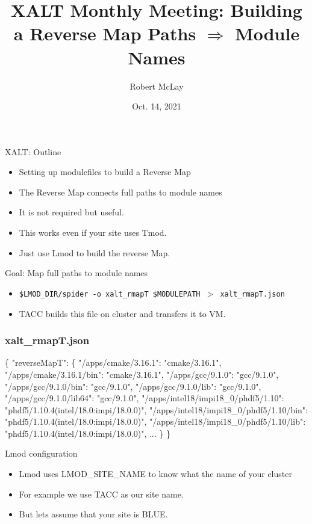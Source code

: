 \documentclass{beamer}
\begin{document}
\title[XALT]{XALT Monthly Meeting: Building a Reverse Map Paths $\Rightarrow$ Module Names}
\author{Robert McLay} 
\date{Oct. 14, 2021} 

\frame{\titlepage} 

\begin{frame}{XALT: Outline}
  \begin{itemize}
    \item Setting up modulefiles to build a Reverse Map
    \item The Reverse Map connects full paths to module names
    \item It is not required but useful.
    \item This works even if your site uses Tmod.
    \item Just use Lmod to build the reverse Map.
  \end{itemize}
\end{frame}

\begin{frame}{Goal: Map full paths to module names}
  \begin{itemize}
    \item \texttt{\$LMOD\_DIR/spider -o xalt\_rmapT \$MODULEPATH $>$ xalt\_rmapT.json}
    \item TACC builds this file on cluster and transfers it to VM.
  \end{itemize}
\end{frame}

\begin{frame}[fragile]
    \frametitle{xalt\_rmapT.json}
 {\tiny
    \begin{semiverbatim}
\{
 "reverseMapT": \{
     "/apps/cmake/3.16.1": "cmake/3.16.1",
     "/apps/cmake/3.16.1/bin": "cmake/3.16.1",
     "/apps/gcc/9.1.0": "gcc/9.1.0",
     "/apps/gcc/9.1.0/bin": "gcc/9.1.0",
     "/apps/gcc/9.1.0/lib": "gcc/9.1.0",
     "/apps/gcc/9.1.0/lib64": "gcc/9.1.0",
     "/apps/intel18/impi18_0/phdf5/1.10": "phdf5/1.10.4(intel/18.0:impi/18.0.0)",
     "/apps/intel18/impi18_0/phdf5/1.10/bin": "phdf5/1.10.4(intel/18.0:impi/18.0.0)",
     "/apps/intel18/impi18_0/phdf5/1.10/lib": "phdf5/1.10.4(intel/18.0:impi/18.0.0)",
     ...
   \}
 \}
    \end{semiverbatim}
}
\end{frame}

\begin{frame}{Lmod configuration}
  \begin{itemize}
    \item Lmod uses LMOD\_SITE\_NAME to know what the name of your cluster
    \item For example we use TACC as our site name.  
    \item But lets assume that your site is BLUE.
  \end{itemize}
\end{frame}
\end{document}
